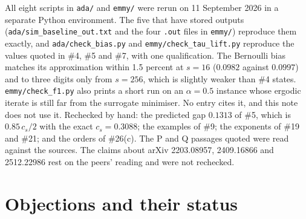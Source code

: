 \documentclass{article}
\begin{document}
All eight scripts in \texttt{ada/} and \texttt{emmy/} were rerun on
11 September 2026 in a separate Python environment. The five that have
stored outputs (\texttt{ada/sim\_baseline\_out.txt} and the four
\texttt{.out} files in \texttt{emmy/}) reproduce them exactly, and
\texttt{ada/check\_bias.py} and \texttt{emmy/check\_tau\_lift.py}
reproduce the values quoted in \#4, \#5 and \#7, with one qualification.
The Bernoulli bias matches its approximation within 1.5 percent at $s=16$
($0.0982$ against $0.0997$) and to three digits only from $s=256$, which
is slightly weaker than \#4 states. \texttt{emmy/check\_f1.py} also prints
a short run on an $\alpha=0.5$ instance whose ergodic iterate is still far
from the surrogate minimiser. No entry cites it, and this note does not
use it. Rechecked by hand: the predicted gap $0.1313$ of \#5, which is
$0.85\,c_s/2$ with the exact $c_s=0.3088$; the examples of \#9; the
exponents of \#19 and \#21; and the orders of \#26(c). The P and Q
passages quoted were read against the sources. The claims about arXiv
2203.08957, 2409.16866 and 2512.22986 rest on the peers' reading and were
not rechecked.

\section{Objections and their status}
\end{document}
